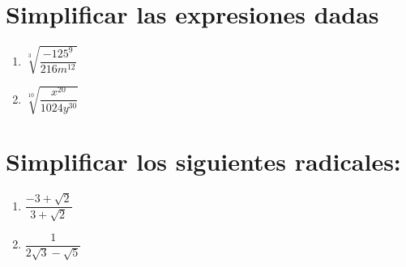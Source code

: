 \documentclass{article}
\begin{document}
\section*{Simplificar las expresiones dadas}

\begin{enumerate}
    \item $\sqrt[3]{\dfrac{-125^9}{216m^{12}}}$
    \item $\sqrt[10]{\dfrac{x^{20}}{1024y^{30}}}$
\end{enumerate}

\section*{Simplificar los siguientes radicales:}

\begin{enumerate}
   \item $\dfrac{-3+\sqrt{2}}{3+\sqrt{2}}$
    \item $\dfrac{1}{2\sqrt{3}-\sqrt{5}}$
  
\end{enumerate}
\end{document}
